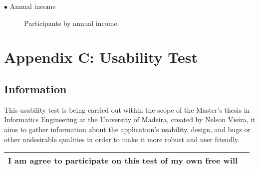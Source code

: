 $\bullet$ Annual income

\begin{figure}[H]
    \begin{center}
        \caption*{Participants by annual income.}
        \label{fig:survey_dd_annual_income}
    \end{center}
\end{figure}

\clearpage

\section*{Appendix C: Usability Test}\label{appendix:usability_tests}

\subsection*{Information}

This usability test is being carried out within the scope of the Master's thesis
in Informatics Engineering at the University of Madeira, created by Nelson Vieira,
it aims to gather information about the application's usability, design, and bugs
or other undesirable qualities in order to make it more robust and user friendly. \\

\begin{tabular}{|m{13cm}|m{1cm}|}
    \hline
    I am agree to participate on this test of my own free will & \\
    \hline
\end{tabular}

